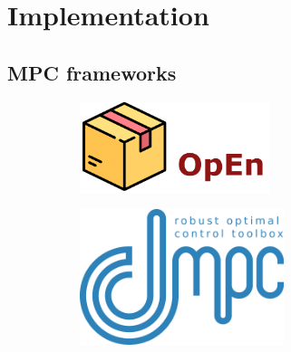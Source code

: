 \documentclass[
  letterpaper,
  DIV=11,
  numbers=noendperiod,
  oneside]{scrartcl}
\begin{document}
\section{Implementation}\label{implementation}

\subsection{MPC frameworks}\label{mpc-frameworks}

\begin{figure}

\begin{minipage}{0.33\linewidth}

\begin{figure}[H]

{\centering \includegraphics[width=\textwidth,height=1.04167in]{figs/package_optimization-engine.png}

}


\end{figure}%

\end{minipage}%
%
\begin{minipage}{0.33\linewidth}

\begin{figure}[H]

{\centering \includegraphics[width=\textwidth,height=1.5625in]{figs/package_dompc.png}

}


\end{figure}%

\end{minipage}%
%
\begin{minipage}{0.33\linewidth}


\end{minipage}
\end{figure}
\end{document}
